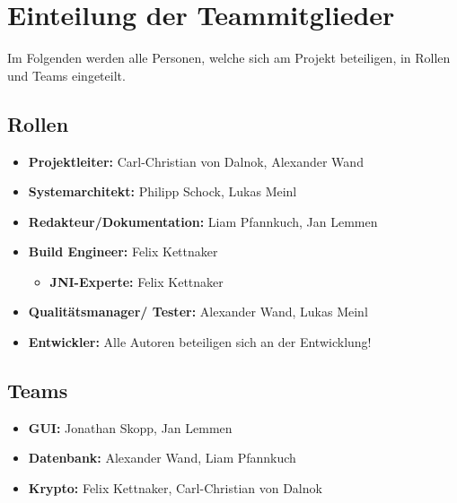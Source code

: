 \section{Einteilung der Teammitglieder}
Im Folgenden werden alle Personen, welche sich am Projekt beteiligen, in Rollen und Teams eingeteilt.

\subsection{Rollen}
\begin{itemize}

				\item \textbf{Projektleiter:} Carl-Christian von Dalnok, Alexander Wand
		
				\item \textbf{Systemarchitekt:} Philipp Schock, Lukas Meinl
			
				\item \textbf{Redakteur/Dokumentation:} Liam Pfannkuch, Jan Lemmen
			
				\item \textbf{Build Engineer:}  Felix Kettnaker
				\begin{itemize}
					\item \textbf{JNI-Experte:} Felix Kettnaker
				\end{itemize}
			
				\item \textbf{Qualitätsmanager/ Tester:} Alexander Wand, Lukas Meinl
					\item \textbf{Entwickler:} Alle Autoren beteiligen sich an der Entwicklung!
			\end{itemize}
		
			
			\subsection{Teams}
			\begin{itemize}
				\item \textbf{GUI:} Jonathan Skopp, Jan Lemmen
			
				\item \textbf{Datenbank:} Alexander Wand, Liam Pfannkuch
			
				\item \textbf{Krypto:} Felix Kettnaker, Carl-Christian von Dalnok
			
			
			\end{itemize}
			

		

